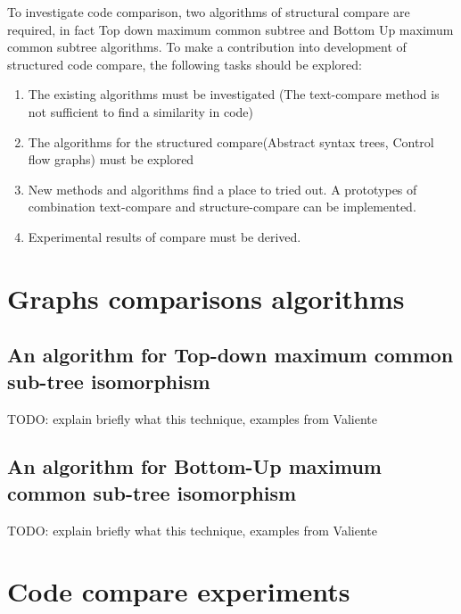 \documentclass{report}
\begin{document}
To investigate code comparison, two algorithms of structural compare are required, in fact Top down maximum common subtree and Bottom Up maximum common subtree algorithms.
To make a contribution into development of structured code compare, the following tasks should be explored:

\begin{enumerate}
  \item The existing algorithms must be investigated (The text-compare method is not sufficient to find a similarity in code)
  \item The algorithms for the structured compare(Abstract syntax trees, Control flow graphs) must be explored 
   \item New methods and algorithms find a place to tried out. A prototypes of combination text-compare and structure-compare can be implemented.
   \item Experimental results of compare must be derived.
\end{enumerate}

\chapter{Graphs comparisons algorithms}
\label{cha:Algorithms1}

\section{An algorithm for Top-down maximum common sub-tree isomorphism }
\label{sec:topdown}

TODO: explain briefly what this technique, examples from Valiente

\section{An algorithm for Bottom-Up maximum common sub-tree isomorphism }
\label{sec:bottomup}
TODO: explain briefly what this technique, examples from Valiente



\chapter{Code compare experiments}
\label{chap:experimental}
\end{document}
